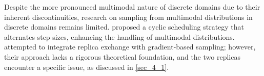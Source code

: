 Despite the more pronounced multimodal nature of discrete domains due to their inherent discontinuities, research on sampling from multimodal distributions in discrete domains remains limited. \citet{pynadath2024gradient} proposed a cyclic scheduling strategy that alternates step sizes, enhancing the handling of multimodal distributions. \citet{zhengexploring} attempted to integrate replica exchange with gradient-based sampling; however, their approach lacks a rigorous theoretical foundation, and the two replicas encounter a specific issue, as discussed in \cref{sec_4_1}.